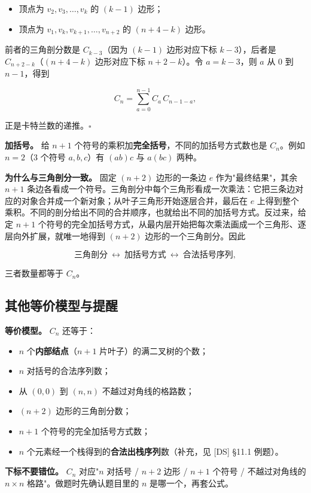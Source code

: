 \begin{itemize}
\item 顶点为 $v_2,v_3,\dots,v_k$ 的 $(k-1)$ 边形；
\item 顶点为 $v_1,v_k,v_{k+1},\dots,v_{n+2}$ 的 $(n+4-k)$ 边形。
\end{itemize}


前者的三角剖分数是 $C_{k-3}$（因为 $(k-1)$ 边形对应下标 $k-3$），后者是 $C_{n+2-k}$（$(n+4-k)$ 边形对应下标 $n+2-k$）。令 $a=k-3$，则 $a$ 从 $0$ 到 $n-1$，得到

\[
C_n=\sum_{a=0}^{n-1}C_a\,C_{n-1-a},
\]

正是卡特兰数的递推。$\square$

\textbf{加括号。} 给 $n+1$ 个符号的乘积加\textbf{完全括号}，不同的加括号方式数也是 $C_n$。例如 $n=2$（3 个符号 $a,b,c$）有 $(ab)c$ 与 $a(bc)$ 两种。

\textbf{为什么与三角剖分一致。} 固定 $(n+2)$ 边形的一条边 $e$ 作为"最终结果"，其余 $n+1$ 条边各看成一个符号。三角剖分中每个三角形看成一次乘法：它把三条边对应的对象合并成一个新对象；从叶子三角形开始逐层合并，最后在 $e$ 上得到整个乘积。不同的剖分给出不同的合并顺序，也就给出不同的加括号方式。反过来，给定 $n+1$ 个符号的完全加括号方式，从最内层开始把每次乘法画成一个三角形、逐层向外扩展，就唯一地得到 $(n+2)$ 边形的一个三角剖分。因此

\[
\text{三角剖分}\ \longleftrightarrow\ \text{加括号方式}\ \longleftrightarrow\ \text{合法括号序列},
\]

三者数量都等于 $C_n$。

\subsection{其他等价模型与提醒}


\textbf{等价模型。} $C_n$ 还等于：

\begin{itemize}
\item $n$ 个\textbf{内部结点}（$n+1$ 片叶子）的满二叉树的个数；
\item $n$ 对括号的合法序列数；
\item 从 $(0,0)$ 到 $(n,n)$ 不越过对角线的格路数；
\item $(n+2)$ 边形的三角剖分数；
\item $n+1$ 个符号的完全加括号方式数；
\item $n$ 个元素经一个栈得到的\textbf{合法出栈序列}数（补充，见 [DS] §11.1 例题）。
\end{itemize}


\textbf{下标不要错位。} $C_n$ 对应"$n$ 对括号 / $n+2$ 边形 / $n+1$ 个符号 / 不越过对角线的 $n\times n$ 格路"。做题时先确认题目里的 $n$ 是哪一个，再套公式。

